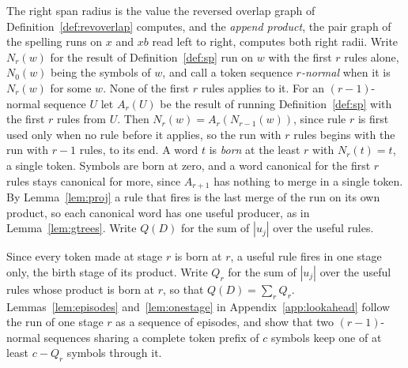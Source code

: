 \documentclass[11pt,a4paper]{article}
\theoremstyle{definition}
\theoremstyle{plain}
\begin{document}
The right span radius is the value the reversed overlap graph of Definition~\ref{def:revoverlap} computes, and the
\emph{append product}, the pair graph of the spelling runs on \(x\) and \(xb\) read left to right, computes both right
radii.
Write \(N_r(w)\) for the result of Definition~\ref{def:sp} run on \(w\) with the first \(r\) rules alone, \(N_0(w)\)
being the symbols of \(w\), and call a token sequence \emph{\(r\)-normal} when it is \(N_r(w)\) for some \(w\). None of
the first \(r\) rules applies to it. For an \((r-1)\)-normal sequence \(U\) let \(A_r(U)\) be the result of running
Definition~\ref{def:sp} with the first \(r\) rules from \(U\). Then \(N_r(w) = A_r(N_{r-1}(w))\), since rule \(r\) is
first used only when no rule before it applies, so the run with \(r\) rules begins with the run with \(r - 1\) rules, to
its end. A word \(t\) is \emph{born} at the least \(r\) with \(N_r(t) = t\), a single token. Symbols are born at zero,
and a word canonical for the first \(r\) rules stays canonical for more, since \(A_{r+1}\) has nothing to merge in a
single token. By Lemma~\ref{lem:proj} a rule that fires is the last merge of the run on its own product, so each
canonical word has one useful producer, as in Lemma~\ref{lem:gtrees}. Write \(Q(D)\) for the sum of \(|u_j|\) over the
useful rules.

Since every token made at stage \(r\) is born at \(r\), a useful rule fires in one stage only, the birth stage of its
product. Write \(Q_r\) for the sum of \(|u_j|\) over the useful rules whose product is born at \(r\), so that
\(Q(D) = \sum_r Q_r\). Lemmas~\ref{lem:episodes} and~\ref{lem:onestage} in Appendix~\ref{app:lookahead} follow the run
of one stage \(r\) as a sequence of episodes, and show that two \((r-1)\)-normal sequences sharing a complete token
prefix of \(c\) symbols keep one of at least \(c - Q_r\) symbols through it.
\end{document}

